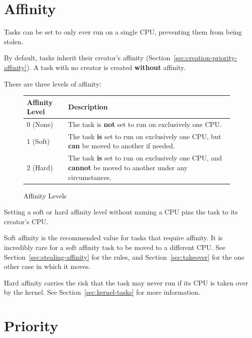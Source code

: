 \documentclass[11pt]{article}
\begin{document}
\section{Affinity}
\label{sec:affinity}

Tasks can be set to only ever run on a single CPU, preventing them from being stolen.

By default, tasks inherit their creator's affinity (Section~\ref{sec:creation-priority-affinity}). A task with no creator is created \textbf{without} affinity.

There are three levels of affinity:

\begin{figure}[H]
	\centering
	\begin{tabularx}{\linewidth}{@{}lX@{}}
		\toprule
		\textbf{Affinity Level} & \textbf{Description}                                                                                                     \\
		\midrule
		0 (None)                & The task is \textbf{not} set to run on exclusively one CPU.                                                              \\
		1 (Soft)                & The task \textbf{is} set to run on exclusively one CPU, but \textbf{can} be moved to another if needed.                  \\
		2 (Hard)                & The task \textbf{is} set to run on exclusively one CPU, and \textbf{cannot} be moved to another under any circumstances. \\
		\bottomrule
	\end{tabularx}
	\caption{Affinity Levels}
	\label{fig:affinity-levels}
\end{figure}

Setting a soft or hard affinity level without naming a CPU pins the task to its creator's CPU.

Soft affinity is the recommended value for tasks that require affinity. It is incredibly rare for a soft affinity task to be moved to a different CPU.
See Section~\ref{sec:stealing-affinity} for the rules, and Section~\ref{sec:takeover} for the one other case in which it moves.

Hard affinity carries the risk that the task may never run if its CPU is taken over by the kernel.
See Section~\ref{sec:kernel-tasks} for more information.

\section{Priority}
\label{sec:priority}
\end{document}
